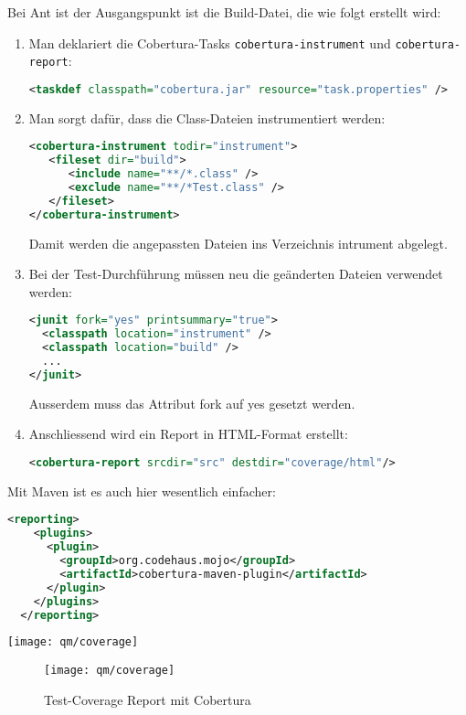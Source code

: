 \newslide
Bei Ant ist der Ausgangspunkt ist die Build-Datei, die wie folgt erstellt wird:
\begin{enumerate}
\item Man deklariert die Cobertura-Tasks \verb+cobertura-instrument+ und
  \verb+cobertura-report+:
  \begin{lstlisting}[language=xml,morekeywords={taskdef}]
<taskdef classpath="cobertura.jar" resource="task.properties" />
  \end{lstlisting}
\newslide
\item Man sorgt dafür, dass die Class-Dateien instrumentiert werden:
  \begin{lstlisting}[language=xml,
    morekeywords={cobertura,instrument,fileset,include,exclude}]
<cobertura-instrument todir="instrument">
   <fileset dir="build">
      <include name="**/*.class" />
      <exclude name="**/*Test.class" />
   </fileset>
</cobertura-instrument>
  \end{lstlisting}
  Damit werden die angepassten Dateien ins Verzeichnis intrument abgelegt.
\newslide
\item Bei der Test-Durchführung müssen neu die geänderten Dateien verwendet
  werden:
  \begin{lstlisting}[language=xml,morekeywords={junit,classpath}]
<junit fork="yes" printsummary="true">
  <classpath location="instrument" />
  <classpath location="build" />
  ...
</junit>
  \end{lstlisting}
  Ausserdem muss das Attribut fork auf yes gesetzt werden.
\newslide
\item Anschliessend wird ein Report in HTML-Format erstellt:
  \begin{lstlisting}[language=xml,morekeywords={cobertura,report}]
<cobertura-report srcdir="src" destdir="coverage/html"/>
  \end{lstlisting}
\end{enumerate}
%
Mit Maven ist es auch hier wesentlich einfacher:
\begin{lstlisting}[language=xml,
  morekeywords={reporting,plugins,plugin,groupId,artifactId}]
  <reporting>
    <plugins>
      <plugin>
        <groupId>org.codehaus.mojo</groupId>
        <artifactId>cobertura-maven-plugin</artifactId>
      </plugin>
    </plugins>
  </reporting>
\end{lstlisting}
\ifslides
  \texttt{[image: qm/coverage]}
\else
\begin{figure}[H]
  \centering
  \texttt{[image: qm/coverage]}
  \caption{Test-Coverage Report mit Cobertura}
  \label{fig:cobertura}
\end{figure}
\fi
\newpage
